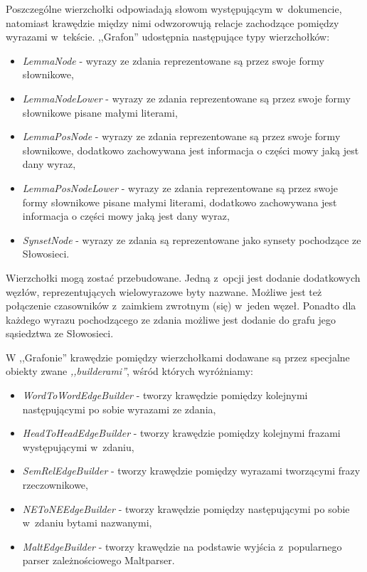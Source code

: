 \documentclass[a4paper, twoside, 12pt]{report}
\begin{document}
        Poszczególne wierzchołki odpowiadają słowom występującym w~dokumencie, natomiast krawędzie między nimi
        odwzorowują relacje zachodzące pomiędzy wyrazami w~tekście. ,,Grafon'' udostępnia następujące typy wierzchołków:
        \begin{itemize}
            \item \emph{LemmaNode} - wyrazy ze zdania reprezentowane są przez swoje formy słownikowe,
            \item \emph{LemmaNodeLower} - wyrazy ze zdania reprezentowane są przez swoje formy słownikowe pisane małymi literami,
            \item \emph{LemmaPosNode} - wyrazy ze zdania reprezentowane są przez swoje formy słownikowe, dodatkowo zachowywana
                jest informacja o części mowy jaką jest dany wyraz,
            \item \emph{LemmaPosNodeLower} - wyrazy ze zdania reprezentowane są przez swoje formy słownikowe pisane małymi
                literami, dodatkowo zachowywana jest informacja o części mowy jaką jest dany wyraz,
            \item \emph{SynsetNode} - wyrazy ze zdania są reprezentowane jako synsety pochodzące ze Słowosieci.
        \end{itemize}

        Wierzchołki mogą zostać przebudowane. Jedną z~opcji jest dodanie dodatkowych węzłów, reprezentujących wielowyrazowe
        byty nazwane. Możliwe jest też połączenie czasowników z~zaimkiem zwrotnym (się) w~jeden węzeł. Ponadto dla każdego
        wyrazu pochodzącego ze zdania możliwe jest dodanie do grafu jego sąsiedztwa ze Słowosieci.

        W ,,Grafonie'' krawędzie pomiędzy wierzchołkami dodawane są przez specjalne obiekty zwane \emph{,,builderami''},
        wśród których wyróżniamy:
        \begin{itemize}
            \item \emph{WordToWordEdgeBuilder} - tworzy krawędzie pomiędzy kolejnymi następującymi po sobie wyrazami ze
                zdania,
            \item \emph{HeadToHeadEdgeBuilder} - tworzy krawędzie pomiędzy kolejnymi frazami występującymi w~zdaniu,
            \item \emph{SemRelEdgeBuilder} - tworzy krawędzie pomiędzy wyrazami tworzącymi frazy rzeczownikowe,
            \item \emph{NEToNEEdgeBuilder} - tworzy krawędzie pomiędzy następującymi po sobie w~zdaniu bytami nazwanymi,
            \item \emph{MaltEdgeBuilder} - tworzy krawędzie na podstawie wyjścia z~popularnego parser zależnościowego Maltparser.
        \end{itemize}
\end{document}

